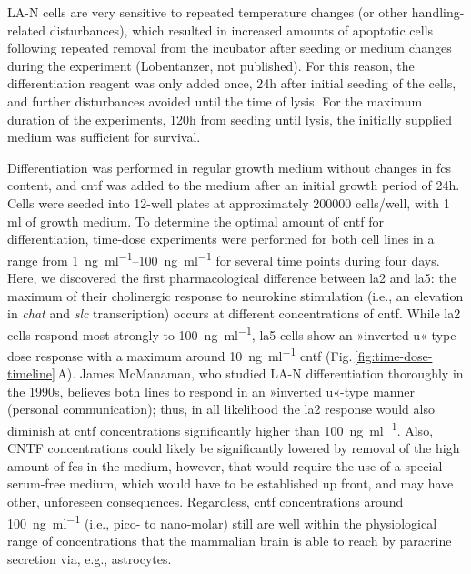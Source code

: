 \begin{method}
LA-N cells are very sensitive to repeated temperature changes (or other handling-related disturbances), which resulted in increased amounts of apoptotic cells following repeated removal from the incubator after seeding or medium changes during the experiment (Lobentanzer, not published). For this reason, the differentiation reagent was only added once, 24h after initial seeding of the cells, and further disturbances avoided until the time of lysis. For the maximum duration of the experiments, 120h from seeding until lysis, the initially supplied medium was sufficient for survival.

Differentiation was performed in regular growth medium without changes in \ac{fcs} content, and \ac{cntf} was added to the medium after an initial growth period of 24h. Cells were seeded into 12-well plates at approximately \num{200000} cells/well, with 1 ml of growth medium. To determine the optimal amount of \ac{cntf} for differentiation, time-dose experiments were performed for both cell lines in a range from \SIrange{1}{100}{\nano\gram\per\milli\litre} for several time points during four days. Here, we discovered the first pharmacological difference between \ac{la2} and \ac{la5}: the maximum of their cholinergic response to neurokine stimulation (i.e., an elevation in \textit{\ac{chat}} and \textit{\ac{slc}} transcription) occurs at different concentrations of \ac{cntf}. While \ac{la2} cells respond most strongly to \SI{100}{\nano\gram\per\milli\litre}, \ac{la5} cells show an »inverted u«-type dose response with a maximum around \SI{10}{\nano\gram\per\milli\litre} \ac{cntf} (Fig.\,\ref{fig:time-dose-timeline}\,A). James McManaman, who studied LA-N differentiation thoroughly in the 1990s,\cite{McManaman1991} believes both lines to respond in an »inverted u«-type manner (personal communication); thus, in all likelihood the \ac{la2} response would also diminish at \ac{cntf} concentrations significantly higher than \SI{100}{\nano\gram\per\milli\litre}. Also, CNTF concentrations could likely be significantly lowered by removal of the high amount of \ac{fcs} in the medium, however, that would require the use of a special serum-free medium, which would have to be established up front, and may have other, unforeseen consequences. Regardless, \ac{cntf} concentrations around \SI{100}{\nano\gram\per\milli\litre} (i.e., pico- to nano-molar) still are well within the physiological range of concentrations that the mammalian brain is able to reach by paracrine secretion via, e.g., astrocytes.\cite{Sun2016}

\end{method}

